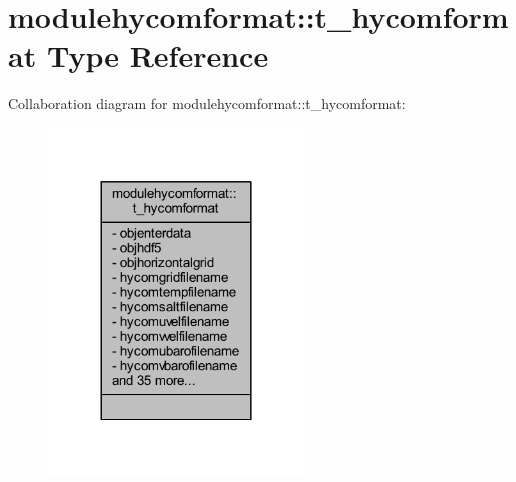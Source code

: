 \hypertarget{structmodulehycomformat_1_1t__hycomformat}{}\section{modulehycomformat\+:\+:t\+\_\+hycomformat Type Reference}
\label{structmodulehycomformat_1_1t__hycomformat}


Collaboration diagram for modulehycomformat\+:\+:t\+\_\+hycomformat\+:\nopagebreak
\begin{figure}[H]
\begin{center}
\leavevmode
\includegraphics[width=192pt]{structmodulehycomformat_1_1t__hycomformat__coll__graph}
\end{center}
\end{figure}
